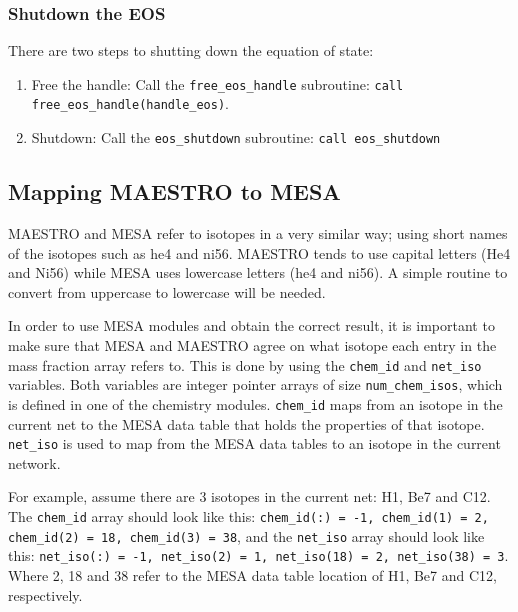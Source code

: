 \subsubsection{Shutdown the EOS}

There are two steps to shutting down the equation of state:
\begin{enumerate}
\item Free the handle: Call the {\tt free\_eos\_handle} subroutine: 
{\tt call free\_eos\_handle(handle\_eos)}.

\item Shutdown: Call the {\tt eos\_shutdown} subroutine: 
{\tt call eos\_shutdown}
\end{enumerate}


\subsection{Mapping {\sf MAESTRO} to {\sf MESA}}
\label{sec:mapping}

{\sf MAESTRO} and {\sf MESA} refer to isotopes in a very similar way; using 
short names of the isotopes such as he4 and ni56. {\sf MAESTRO} 
tends to use capital letters (He4 and Ni56) while {\sf MESA} uses 
lowercase letters (he4 and ni56). A simple routine to convert from 
uppercase to lowercase will be needed.

In order to use {\sf MESA} modules and obtain the correct result, it is 
important to make sure that {\sf MESA} and {\sf MAESTRO} agree on what 
isotope each entry in the mass fraction array refers to. This is done by 
using the {\tt chem\_id} and {\tt net\_iso} variables. Both variables are 
integer pointer arrays of size {\tt num\_chem\_isos}, which is defined in one 
of the chemistry modules. {\tt chem\_id} maps from an isotope in the current 
net to the {\sf MESA} data table that holds the properties of that isotope. 
{\tt net\_iso} is used to map from the {\sf MESA} data tables to an isotope 
in the current network. 

For example, assume there are 3 isotopes in the current net: H1, Be7 and C12. 
The {\tt chem\_id} array should look like this: {\tt chem\_id(:) = -1, 
chem\_id(1) = 2, chem\_id(2) = 18, chem\_id(3) = 38}, and the 
{\tt net\_iso} array should look like this: {\tt net\_iso(:) = -1, 
net\_iso(2) = 1, net\_iso(18) = 2, net\_iso(38) = 3}. Where 2, 18 and 38 
refer to the {\sf MESA} data table location of H1, Be7 and C12, respectively.

